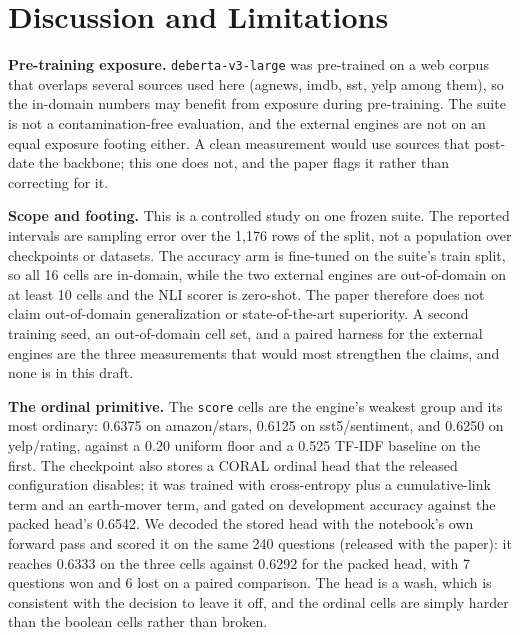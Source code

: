 \section{Discussion and Limitations}
\label{sec:limitations}

\textbf{Pre-training exposure.}
\texttt{deberta-v3-large} was pre-trained on a web corpus that overlaps several sources used here
(agnews, imdb, sst, yelp among them), so the in-domain numbers may benefit from exposure during
pre-training. The suite is not a contamination-free evaluation, and the external engines are not on
an equal exposure footing either. A clean measurement would use sources that post-date the backbone;
this one does not, and the paper flags it rather than correcting for it.

\textbf{Scope and footing.}
This is a controlled study on one frozen suite. The reported intervals are sampling error over the
1{,}176 rows of the split, not a population over checkpoints or datasets. The accuracy arm is
fine-tuned on the suite's train split, so all 16 cells are in-domain, while the two external
engines are out-of-domain on at least 10 cells and the NLI scorer is zero-shot. The paper
therefore does not claim out-of-domain generalization or state-of-the-art superiority. A second
training seed, an out-of-domain cell set, and a paired harness for the external engines are the
three measurements that would most strengthen the claims, and none is in this draft.

\textbf{The ordinal primitive.}
The \texttt{score} cells are the engine's weakest group and its most ordinary: 0.6375 on
amazon/stars, 0.6125 on sst5/sentiment, and 0.6250 on yelp/rating, against a 0.20 uniform floor and
a 0.525 TF-IDF baseline on the first. The checkpoint also stores a CORAL \cite{cao2020coral} ordinal head that the
released configuration disables; it was trained with cross-entropy plus a cumulative-link term and
an earth-mover term, and gated on development accuracy against the packed head's 0.6542. We decoded
the stored head with the notebook's own forward pass and scored it on the same 240 questions
(released with the paper): it reaches 0.6333 on the three cells against 0.6292 for the packed
head, with 7 questions won and 6 lost on a paired comparison. The head is a wash, which is
consistent with the decision to leave it off, and the ordinal cells are simply harder
than the boolean cells rather than broken.

